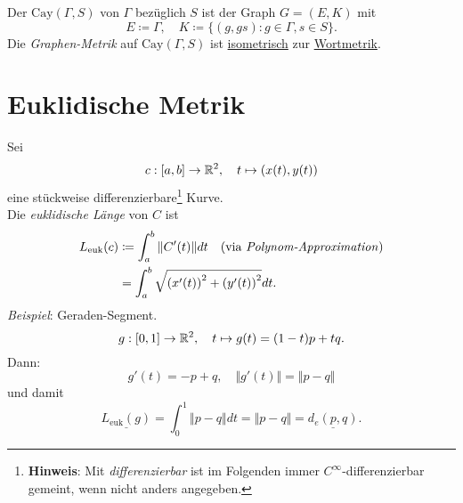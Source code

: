 \begin{definition}
  Der  $ \text{Cay}(\Gamma, S) $ von $ \Gamma $ bezüglich $ S $ ist der Graph $ G = (E, K) $ mit
  \begin{equation*}
    E \coloneqq \Gamma, \quad K \coloneqq \{ (g, gs) : g \in \Gamma, s \in S \}\text{.}
  \end{equation*}
  Die \emph{Graphen-Metrik} auf $ \text{Cay}(\Gamma, S) $ ist \hyperref[def:isometrie]{isometrisch} zur \hyperref[def:wortmetrik]{Wortmetrik}.
\end{definition}

\section{Euklidische Metrik}
\begin{example}
  Sei
  \begin{equation*}
    c : [a,b] \to \mathbb{R}^2, \quad t \mapsto (x(t), y(t))
  \end{equation*}
  eine stückweise differenzierbare\footnote{\textbf{Hinweis}: Mit \emph{differenzierbar} ist im Folgenden immer $ C^\infty $-differenzierbar gemeint, wenn nicht anders angegeben.} Kurve. \\
  Die \emph{euklidische Länge} von $ C $ ist
  \begin{align*}
    L_{\text{euk}}(c) &\coloneqq \int_a^b \Vert C'(t) \Vert dt \quad \text{(via \emph{Polynom-Approximation})} \\
     &= \int_a^b \sqrt{\left( x'(t) \right)^2 + \left( y'(t) \right)^2}dt\text{.}
  \end{align*}
  \emph{Beispiel}: Geraden-Segment.
  \begin{equation*}
    g: [0,1] \to \mathbb{R}^2, \quad t \mapsto g(t) = (1-t)p + tq\text{.}
  \end{equation*}
  Dann:
  \begin{equation*}
    g'(t) = -p+q, \quad \Vert g'(t) \Vert = \Vert p - q \Vert
  \end{equation*}
  und damit
  \begin{equation*}
    \underline{L_{\text{euk}}(g)} = \int_0^1\Vert p - q \Vert dt = \Vert p - q \Vert = \underline{d_e(p,q)}\text{.}
  \end{equation*}
\end{example}

